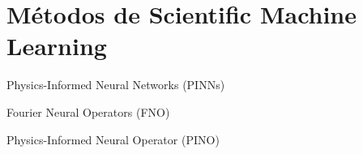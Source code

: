 \section{Métodos de Scientific Machine Learning}

\begin{frame}{Physics-Informed Neural Networks (PINNs)}

\end{frame}

\begin{frame}{Fourier Neural Operators (FNO)}

\end{frame}


\begin{frame}{Physics-Informed Neural Operator (PINO)}

\end{frame}